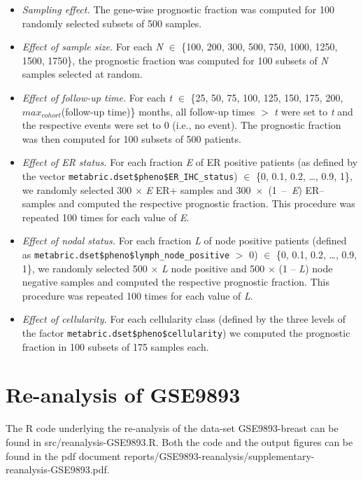 \begin{itemize}
\item \emph{Sampling effect.}  The gene-wise prognostic fraction was computed
  for 100 randomly selected subsets of 500 samples.
\item \emph{Effect of sample size.}  For each \emph{N} $\in$ \{100, 200, 300,
  500, 750, 1000, 1250, 1500, 1750\}, the prognostic fraction was computed for
  100 subsets of \emph{N} samples selected at random.
\item \emph{Effect of follow-up time.}  For each \emph{t} $\in$ \{25, 50, 75,
  100, 125, 150, 175, 200, $max_{cohort}$(follow-up time)\} months, all
  follow-up times $>$ \emph{t} were set to \emph{t} and the respective events
  were set to 0 (i.e., no event).  The prognostic fraction was then computed for
  100 subsets of 500 patients.
\item \emph{Effect of ER status.}  For each fraction \emph{E} of ER positive
  patients (as defined by the vector
  \texttt{metabric.dset\$pheno\$ER\_IHC\_status}) $\in$ \{0, 0.1, 0.2, \ldots{},
  0.9, 1\}, we randomly selected 300 $\times$ \emph{E} ER+ samples and \mbox{300
    $\times$ (1 -- \emph{E})} ER-- samples and computed the respective
  prognostic fraction.  This procedure was repeated 100 times for each value of
  \emph{E}.
\item \emph{Effect of nodal status.}  For each fraction \emph{L} of node
  positive patients (defined as
  \texttt{metabric.dset\$pheno\$lymph\_node\_positive} $>$ 0) $\in$ \{0, 0.1,
  0.2, \ldots{}, 0.9, 1\}, we randomly selected 500 $\times$ \emph{L} node
  positive and 500 $\times$ (1 -- \emph{L}) node negative samples and computed
  the respective prognostic fraction.  This procedure was repeated 100 times for
  each value of \emph{L}.
\item \emph{Effect of cellularity.}  For each cellularity class (defined by the
  three levels of the factor \texttt{metabric.dset\$pheno\$cellularity}) we
  computed the prognostic fraction in 100 subsets of 175 samples each.
\end{itemize}

\section{Re-analysis of GSE9893}
The \textsf{R} code underlying the re-analysis of the data-set
\textsf{GSE9893-breast} can be found in \textsf{src/reanalysis-GSE9893.R}.  Both
the code and the output figures can be found in the pdf document
\textsf{reports/GSE9893-reanalysis/supplementary-reanalysis-GSE9893.pdf}.

